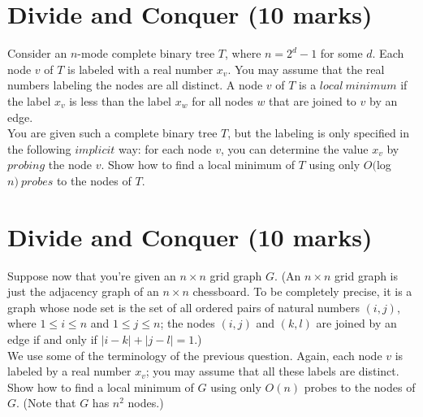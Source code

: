 \documentclass[a4paper,11pt]{article}
\begin{document}
\section{Divide and Conquer (10 marks)}

Consider an $n$-mode complete binary tree $T$, where $n=2^d-1$ for some $d$. Each node $v$ of $T$ is labeled with a real number $x_v$. You may assume that the real numbers labeling the nodes are all distinct. A node $v$ of $T$ is a $local\ minimum$ if the label $x_v$ is less than the label $x_w$ for all nodes $w$ that are joined to $v$ by an edge.\\

You are given such a complete binary tree $T$, but the labeling is only specified in the following $implicit$ way: for each node $v$, you can determine the value $x_v$ by $probing$ the node $v$. Show how to find a local minimum of $T$ using only $O($log$n)\ probes$ to the nodes of $T$.

\section{Divide and Conquer (10 marks)}

Suppose now that you're given an $n\times n$ grid graph $G$. (An $n\times n$ grid graph is just the adjacency graph of an $n \times n$ chessboard. To be completely precise, it is a graph whose node set is the set of all ordered pairs of natural numbers $(i,j)$, where $1\leq i\leq n$ and $1\leq j\leq n$; the nodes $(i,j)$ and $(k,l)$ are joined by an edge if and only if $|i-k|+|j-l|=1$.)\\

We use some of the terminology of the previous question. Again, each node $v$ is labeled by a real number $x_v$; you may assume that all these labels are distinct. Show how to find a local minimum of $G$ using only $O(n)$ probes to the nodes of $G$. (Note that $G$ has $n^2$ nodes.)
\end{document}
